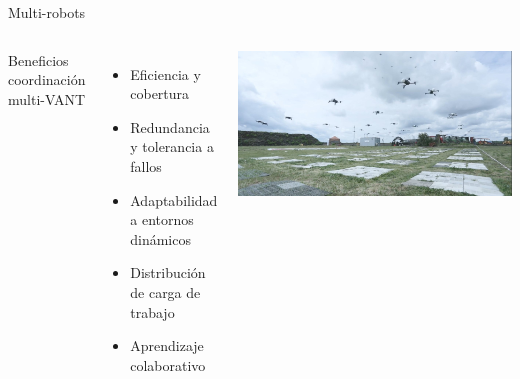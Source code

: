 \documentclass[
	12pt, %
	aspectratio=169, %
]{beamer}
\begin{document}
\begin{frame}{Multi-robots}
  \begin{columns}
    Beneficios coordinación multi-VANT
    \begin{itemize}
    \item Eficiencia y cobertura
    \item Redundancia y tolerancia a fallos
    \item Adaptabilidad a entornos dinámicos
    \item Distribución de carga de trabajo
    \item Aprendizaje colaborativo
    \end{itemize}
    \includegraphics[width=\textwidth]{drone_swarm}
  \end{columns}
\end{frame}

\end{document}
